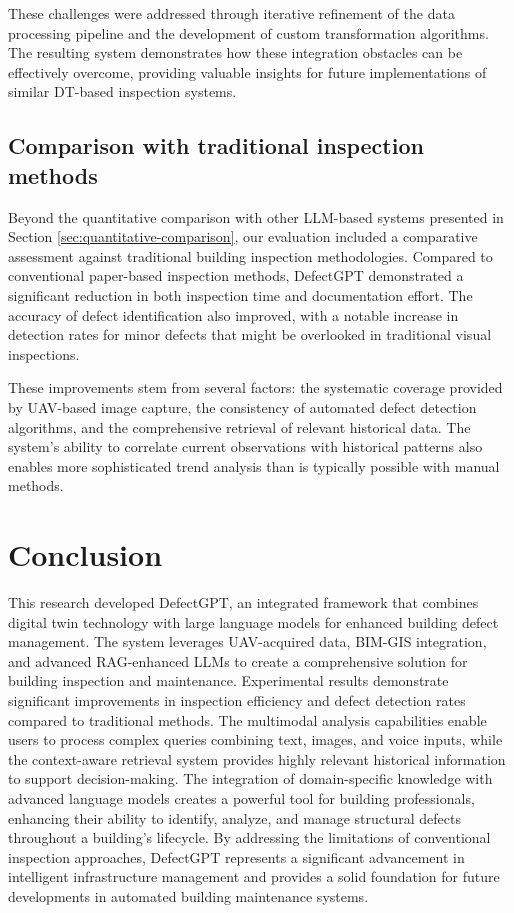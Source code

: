 \documentclass[a4paper,fleqn]{cas-sc}
\begin{document}
These challenges were addressed through iterative refinement of the data processing pipeline and the development of custom transformation algorithms. The resulting system demonstrates how these integration obstacles can be effectively overcome, providing valuable insights for future implementations of similar DT-based inspection systems.

\subsection{Comparison with traditional inspection methods}

Beyond the quantitative comparison with other LLM-based systems presented in Section \ref{sec:quantitative-comparison}, our evaluation included a comparative assessment against traditional building inspection methodologies. Compared to conventional paper-based inspection methods, DefectGPT demonstrated a significant reduction in both inspection time and documentation effort. The accuracy of defect identification also improved, with a notable increase in detection rates for minor defects that might be overlooked in traditional visual inspections.

These improvements stem from several factors: the systematic coverage provided by UAV-based image capture, the consistency of automated defect detection algorithms, and the comprehensive retrieval of relevant historical data. The system's ability to correlate current observations with historical patterns also enables more sophisticated trend analysis than is typically possible with manual methods.

\section{Conclusion}

This research developed DefectGPT, an integrated framework that combines digital twin technology with large language models for enhanced building defect management. The system leverages UAV-acquired data, BIM-GIS integration, and advanced RAG-enhanced LLMs to create a comprehensive solution for building inspection and maintenance. Experimental results demonstrate significant improvements in inspection efficiency and defect detection rates compared to traditional methods. The multimodal analysis capabilities enable users to process complex queries combining text, images, and voice inputs, while the context-aware retrieval system provides highly relevant historical information to support decision-making. The integration of domain-specific knowledge with advanced language models creates a powerful tool for building professionals, enhancing their ability to identify, analyze, and manage structural defects throughout a building's lifecycle. By addressing the limitations of conventional inspection approaches, DefectGPT represents a significant advancement in intelligent infrastructure management and provides a solid foundation for future developments in automated building maintenance systems.
\end{document}
